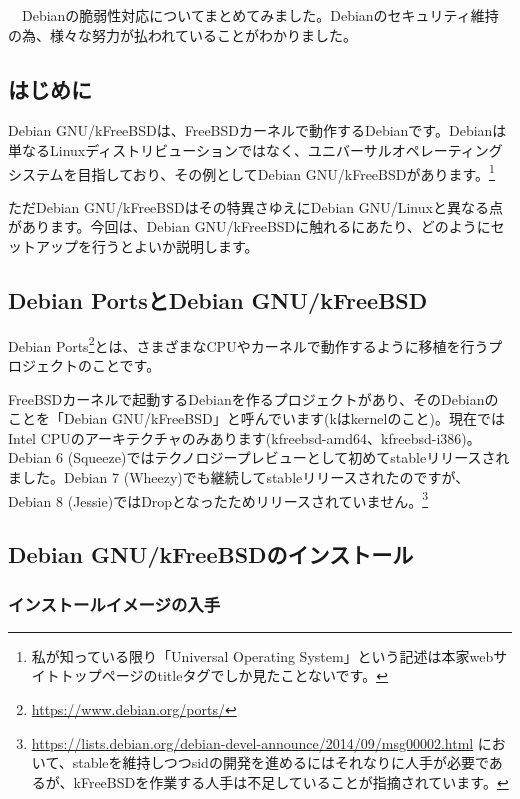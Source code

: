 \documentclass[mingoth,a4paper]{jsarticle}
\begin{document}
　Debianの脆弱性対応についてまとめてみました。Debianのセキュリティ維持の為、様々な努力が払われていることがわかりました。


\subsection{はじめに}

Debian GNU/kFreeBSDは、FreeBSDカーネルで動作するDebianです。Debianは単なるLinuxディストリビューションではなく、ユニバーサルオペレーティングシステムを目指しており、その例としてDebian GNU/kFreeBSDがあります。\footnote{私が知っている限り「Universal Operating System」という記述は本家webサイトトップページのtitleタグでしか見たことないです。}

ただDebian GNU/kFreeBSDはその特異さゆえにDebian GNU/Linuxと異なる点があります。今回は、Debian GNU/kFreeBSDに触れるにあたり、どのようにセットアップを行うとよいか説明します。

\subsection{Debian PortsとDebian GNU/kFreeBSD}

Debian Ports\footnote{\url{https://www.debian.org/ports/}}とは、さまざまなCPUやカーネルで動作するように移植を行うプロジェクトのことです。

FreeBSDカーネルで起動するDebianを作るプロジェクトがあり、そのDebianのことを「Debian GNU/kFreeBSD」と呼んでいます(kはkernelのこと)。現在ではIntel CPUのアーキテクチャのみあります(kfreebsd-amd64、kfreebsd-i386)。Debian 6 (Squeeze)ではテクノロジープレビューとして初めてstableリリースされました。Debian 7 (Wheezy)でも継続してstableリリースされたのですが、Debian 8 (Jessie)ではDropとなったためリリースされていません。\footnote{\url{https://lists.debian.org/debian-devel-announce/2014/09/msg00002.html} において、stableを維持しつつsidの開発を進めるにはそれなりに人手が必要であるが、kFreeBSDを作業する人手は不足していることが指摘されています。}


\subsection{Debian GNU/kFreeBSDのインストール}
\subsubsection{インストールイメージの入手}
\end{document}
